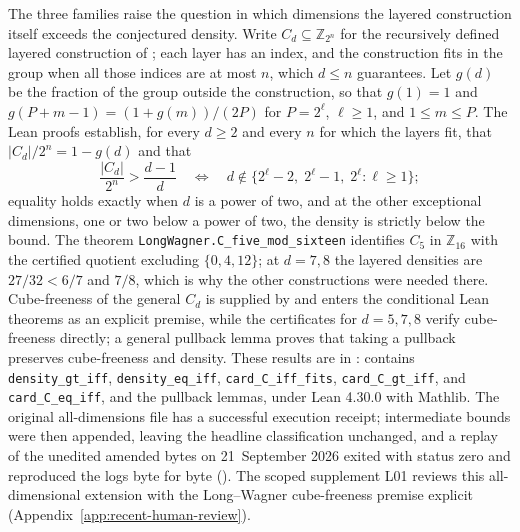 The three families raise the question in which dimensions the layered construction itself exceeds the conjectured density. Write $C_d\subseteq\mathbb Z_{2^n}$ for the recursively defined layered construction of \citet{long2019projective}; each layer has an index, and the construction fits in the group when all those indices are at most $n$, which $d\le n$ guarantees. Let $g(d)$ be the fraction of the group outside the construction, so that $g(1)=1$ and $g(P+m-1)=(1+g(m))/(2P)$ for $P=2^\ell$, $\ell\ge1$, and $1\le m\le P$. The Lean proofs establish, for every $d\ge2$ and every $n$ for which the layers fit, that $|C_d|/2^n=1-g(d)$ and that
\[
 \frac{|C_d|}{2^n}>\frac{d-1}{d}
 \quad\Longleftrightarrow\quad
 d\notin\{2^\ell-2,\;2^\ell-1,\;2^\ell:\ell\ge1\};
\]
equality holds exactly when $d$ is a power of two, and at the other exceptional dimensions, one or two below a power of two, the density is strictly below the bound. The theorem \texttt{LongWagner.C\_five\_mod\_sixteen} identifies $C_5$ in $\mathbb Z_{16}$ with the certified quotient excluding $\{0,4,12\}$; at $d=7,8$ the layered densities are $27/32<6/7$ and $7/8$, which is why the other constructions were needed there. Cube-freeness of the general $C_d$ is supplied by \citet[Section~3.1 and Claim~3.1]{long2019projective} and enters the conditional Lean theorems as an explicit premise, while the certificates for $d=5,7,8$ verify cube-freeness directly; a general pullback lemma proves that taking a pullback preserves cube-freeness and density. These results are in :  contains \texttt{density\_gt\_iff}, \texttt{density\_eq\_iff}, \texttt{card\_C\_iff\_fits}, \texttt{card\_C\_gt\_iff}, and \texttt{card\_C\_eq\_iff}, and  the pullback lemmas, under Lean 4.30.0 with Mathlib. The original all-dimensions file has a successful execution receipt; intermediate bounds were then appended, leaving the headline classification unchanged, and a replay of the unedited amended bytes on 21~September 2026 exited with status zero and reproduced the logs byte for byte (). The scoped supplement L01 reviews this all-dimensional extension with the Long--Wagner cube-freeness premise explicit (Appendix~\ref{app:recent-human-review}).

